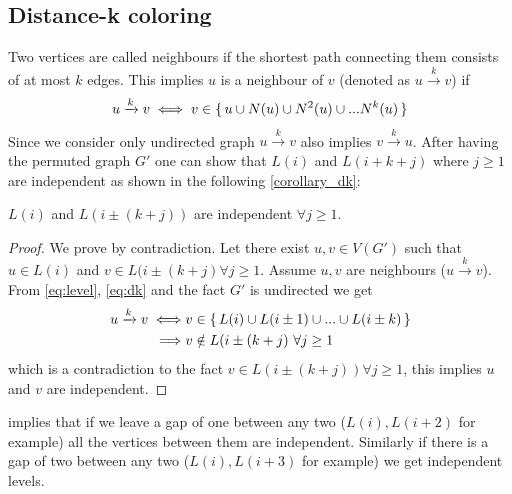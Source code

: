  \subsection{Distance-k coloring} \label{subsec:DK}
 Two vertices are called \DK neighbours if the shortest path connecting them consists of at most $k$ edges. This implies $u$ is a \DK neighbour of $v$ (denoted as $u\xrightarrow{k}v$)  if
 \begin{equation}\label{eq:dk}
	  u\xrightarrow{k}v  \iff  v \in \set{ u \cup N(u) \cup N^2(u) \cup ... N^k(u) }	 
 \end{equation}
 Since we consider only undirected graph $u\xrightarrow{k}v$ also implies $v\xrightarrow{k}u$. 
  After having the permuted graph $G'$ one can show that $L(i)$ and $L(i+k+j)$ where $j\geq1$ are \DK independent as shown in the following \cref{corollary_dk}:
  \begin{corollary}\label{corollary_dk}
   $L(i)$ and $L(i\pm(k+j))$ are \DK independent $\forall j\geq1$. 
  \end{corollary}
  \begin{proof}
  	We prove by contradiction. Let there exist $u,v \in V(G')$ such that  $u \in L(i)$ and $v \in  L(i \pm (k+j) \forall j\geq1$. Assume $u,v$ are \DK neighbours ($u\xrightarrow{k}v$). From \cref{eq:level}, \cref{eq:dk} and the fact $G'$ is undirected we get 
  	\begin{align*}
	  	u\xrightarrow{k}v \iff & v \in \set{L(i) \cup L(i \pm 1) \cup ... \cup L(i \pm k)} \\
	  	\implies & v \notin L(i \pm (k+j) \text{  } \forall j \geq 1
  	\end{align*}
  	which is a contradiction to the fact $v \in L(i \pm (k+j) ) \forall j \geq 1$, this implies $u$ and $v$ are \DK independent.
  \end{proof}

 implies that if we leave a gap of \emph{\atleast} one \level between any two \levels ($L(i), L(i+2)$ for example) all the vertices between them are \DONE independent. Similarly if there is a gap of \emph{\atleast} two \levels between any two \levels ($L(i), L(i+3)$ for example) we get \DTWO independent levels.
  
